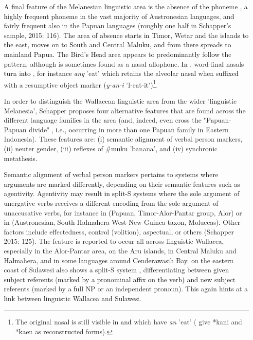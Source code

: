 A final feature of the Melanesian linguistic area is the absence of the phoneme , a highly frequent phoneme in the vast majority of Austronesian languages, and fairly frequent also in the Papuan languages (roughly one half in Schapper's sample, 2015: 116). The area of absence starts in Timor, Wetar and the islands to the east, moves on to South and Central Maluku, and from there spreads to mainland Papua. The Bird's Head area appears to  predominantly follow the pattern, although  is sometimes found as a nasal allophone. In , word-final nasals turn into , for instance \textit{ang} 'eat' which retains the alveolar nasal when suffixed with a resumptive object marker (\textit{y-an-i} 'I-eat-it')\footnote{The original nasal is still visible in  and  which have \textit{an} 'eat' (\citealt{ross2008lexicon} give  *kani and  *kaen as reconstructed forms).}.

In order to distinguish the Wallacean linguistic area from the wider 'linguistic Melanesia', Schapper proposes four alternative features that are found across the different language families in the area (and, indeed, even cross the "Papuan-Papuan divide" \citep[124]{schapper2015wallacea}, i.e., occurring in more than one Papuan family in Eastern Indonesia). These features are: (i) semantic alignment of verbal person markers, (ii) neuter gender, (iii) reflexes of \#muku 'banana', and (iv) synchronic metathesis.

Semantic alignment of verbal person markers pertains to systems where arguments are marked differently, depending on their semantic features such as agentivity. Agentivity may result in split-S systems where the sole argument of unergative verbs receives a different encoding from the sole argument of unaccusative verbs, for instance in  (Papuan, Timor-Alor-Pantar group, Alor) or in  (Austronesian, South Halmahera-West New Guinea taxon, Moluccas). Other factors include effectedness, control (volition), aspectual, or others (Schapper 2015: 125). The feature is reported to occur all across linguistic Wallacea, especially in the Alor-Pantar area, on the Aru islands, in Central Maluku and Halmahera, and in some languages around Cenderawasih Bay.  on the eastern coast of Sulawesi also shows a split-S system \citep{Barsel1994}, differentiating between given subject referents (marked by a pronominal affix on the verb) and new subject referents (marked by a full NP or an independent pronoun). This again hints at a link between linguistic Wallacea and Sulawesi.

